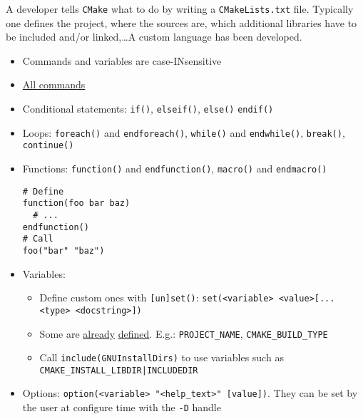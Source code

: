 \documentclass[a4paper,12pt,%
              final%
              ]{article}
\begin{document}
A developer tells \texttt{CMake} what to do by writing a \texttt{CMakeLists.txt} file. Typically one defines the project, where the sources are, which additional libraries have to be included and/or linked,\ldots A custom language has been developed.
\begin{itemize}
  \item Commands and variables are case-INsensitive
  \item \href{https://cmake.org/cmake/help/latest/manual/cmake-commands.7.html}{All commands}
  \item Conditional statements: \verb|if()|, \verb|elseif()|, \verb|else()| \verb|endif()|
  \item Loops: \verb|foreach()| and \verb|endforeach()|, \verb|while()| and \verb|endwhile()|, \verb|break()|, \verb|continue()|
  \item Functions: \verb|function()| and \verb|endfunction()|, \verb|macro()| and \verb|endmacro()|
\begin{verbatim}
# Define
function(foo bar baz)
  # ...
endfunction()
# Call
foo("bar" "baz")
\end{verbatim}
  \item Variables:
    \begin{itemize}
      \item Define custom ones with \verb|[un]set()|: \verb|set(<variable> <value>[... <type> <docstring>])|
      \item Some are \href{https://cmake.org/cmake/help/latest/manual/cmake-variables.7.html}{already} \href{https://cmake.org/cmake/help/latest/manual/cmake-env-variables.7.html}{defined}. E.g.: \verb|PROJECT_NAME|, \verb|CMAKE_BUILD_TYPE|
      \item Call \verb|include(GNUInstallDirs)| to use variables such as \verb!CMAKE_INSTALL_LIBDIR|INCLUDEDIR!
    \end{itemize}
  \item Options: \verb|option(<variable> "<help_text>" [value])|. They can be set by the user at configure time with the \verb|-D| handle
\end{itemize}

\end{document}
